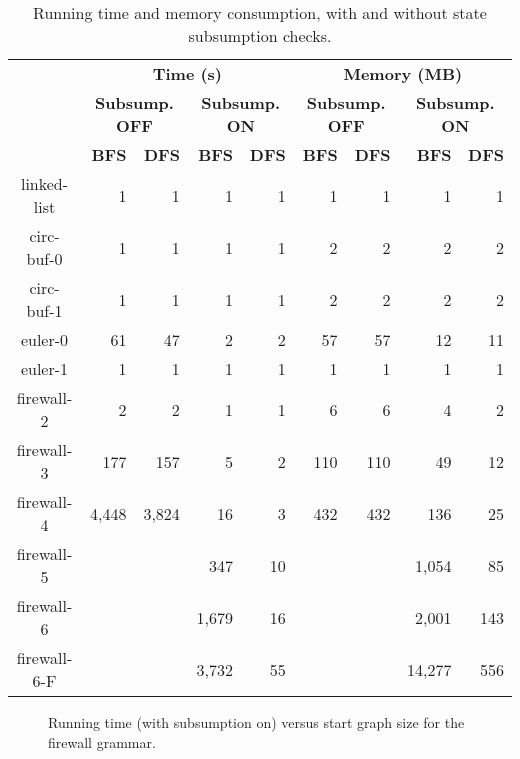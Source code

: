 \begin{table}[t]
\centering
\caption{Running time and memory consumption, with and without state subsumption
checks.}
\scriptsize
\begin{tabular}{c|rr|rr|rr|rr}
\hline
\bf \multirow{3}{*}{Grammar} & \multicolumn{4}{|c|}{\bf Time (s)} &
\multicolumn{4}{|c}{\bf Memory (MB)} \\
& \multicolumn{2}{|c|}{\bf Subsump. OFF} &
\multicolumn{2}{|c|}{\bf Subsump. ON} &
\multicolumn{2}{|c|}{\bf Subsump. OFF} &
\multicolumn{2}{|c}{\bf Subsump. ON} \\
& \bf BFS & \bf DFS
& \bf BFS & \bf DFS
& \bf BFS & \bf DFS
& \bf BFS & \bf DFS \\
\hline
linked-list &  1 &  1 &  1 &  1 &  1 &  1 &  1 &  1 \\
circ-buf-0 &  1 &  1 &  1 &  1 & 2 & 2 & 2 & 2 \\
circ-buf-1 &  1 &  1 &  1 &  1 & 2 & 2 & 2 & 2 \\
euler-0 & 61 & 47 & 2 & 2 & 57 & 57 & 12 & 11 \\
euler-1 &  1 &  1 &  1 &  1 &  1 &  1 &  1 &  1 \\
firewall-2 & 2 & 2 &  1 &  1 & 6 & 6 & 4 & 2 \\
firewall-3 & 177 & 157 & 5 & 2 & 110 & 110 & 49 & 12 \\
firewall-4 & 4,448 & 3,824 & 16 & 3 & 432 & 432 & 136 & 25 \\
firewall-5 & & & 347 & 10 & & & 1,054 & 85 \\
firewall-6 & & & 1,679 & 16 & & & 2,001 & 143 \\
firewall-6-F & & & 3,732 & 55 & & & 14,277 & 556 \\
\hline
\end{tabular}
\end{table}

\begin{figure}[t]
\centering
{}
\vspace{-2ex}
\caption{Running time (with subsumption on) versus start graph size for the
firewall grammar.}
\end{figure}
